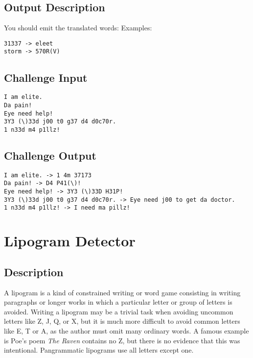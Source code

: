 \subsection*{Output Description}\label{output-description-23}

You should emit the translated words: Examples:

\begin{lstlisting}
31337 -> eleet
storm -> 570R(V)
\end{lstlisting}

\subsection*{Challenge Input}\label{challenge-input-24}

\begin{lstlisting}
I am elite.
Da pain!
Eye need help!
3Y3 (\)33d j00 t0 g37 d4 d0c70r.
1 n33d m4 p1llz!
\end{lstlisting}

\subsection*{Challenge Output}\label{challenge-output-21}

\begin{lstlisting}
I am elite. -> 1 4m 37173
Da pain! -> D4 P41(\)!
Eye need help! -> 3Y3 (\)33D H31P!
3Y3 (\)33d j00 t0 g37 d4 d0c70r. -> Eye need j00 to get da doctor.
1 n33d m4 p1llz! -> I need ma pillz!
\end{lstlisting}


\section{Lipogram Detector}

\subsection*{Description}\label{description-31}

A lipogram is a kind of constrained writing or word game consisting in
writing paragraphs or longer works in which a particular letter or group
of letters is avoided. Writing a lipogram may be a trivial task when
avoiding uncommon letters like Z, J, Q, or X, but it is much more
difficult to avoid common letters like E, T or A, as the author must
omit many ordinary words. A famous example is Poe's poem \emph{The
Raven} contains no Z, but there is no evidence that this was
intentional. Pangrammatic lipograms use all letters except one.

